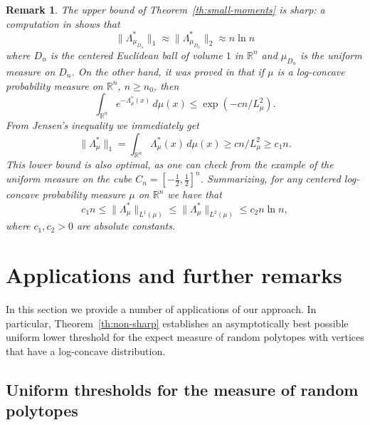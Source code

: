 \documentclass[11pt,leqno]{article}
\newtheorem{remark}[theorem]{Remark}
\theoremstyle{definition}
\theoremstyle{remark}
\numberwithin{equation}{section}
\newcommand{\ls}{\leqslant}
\newcommand{\gr}{\geqslant}
\newcommand{\1}{\textbf{1}}
\begin{document}
\begin{remark}\label{rem:optimal}\rm The upper bound of Theorem~\ref{th:small-moments} is sharp: a computation in
\cite{BGP-threshold} shows that
$$\|\Lambda_{\mu_{D_n}}^{\ast}\|_1\approx \|\Lambda_{\mu_{D_n}}^{\ast}\|_2\approx n\ln n$$
where $D_n$ is the centered Euclidean ball of volume $1$ in $\mathbb{R}^n$ and $\mu_{D_n}$ is the
uniform measure on $D_n$. On the other hand, it was proved in \cite{BGP-depth} that if $\mu$ is a log-concave
probability measure on ${\mathbb R}^n$, $n\gr n_0$, then
$$\int_{\mathbb{R}^n}e^{-\Lambda_{\mu }^{\ast}(x)}\,d\mu(x) \ls \exp\left(-cn/L_{\mu }^2\right).$$
From Jensen's inequality we immediately get
$$\|\Lambda_{\mu}^{\ast}\|_1=\int_{\mathbb{R}^n}\Lambda_{\mu }^{\ast}(x)\,d\mu(x) \gr cn/L_{\mu }^2\gr c_1n.$$
This lower bound is also optimal, as one can check from the example of the uniform measure on the cube $C_n=\left[-\frac{1}{2},\frac{1}{2}\right]^n$. Summarizing, for any centered log-concave probability measure
$\mu$ on $\mathbb{R}^n$ we have that
$$c_1n\ls \|\Lambda_{\mu}^{\ast}\|_{L^1(\mu)}\ls\|\Lambda_{\mu}^{\ast}\|_{L^2(\mu)}\ls c_2n\ln n,$$
where $c_1,c_2>0$ are absolute constants.
\end{remark}

\section{Applications and further remarks}\label{section-4}

In this section we provide a number of applications of our approach. In particular, Theorem~\ref{th:non-sharp}
establishes an asymptotically best possible uniform lower threshold for the expect measure of random polytopes
with vertices that have a log-concave distribution.

\subsection{Uniform thresholds for the measure of random polytopes}\label{subsection-4.1}
\end{document}
